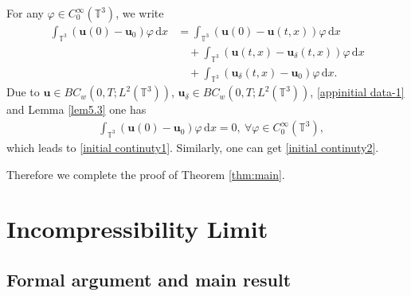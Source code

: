\documentclass[reqno,a4paper,11pt]{amsart}
\theoremstyle{plain}
\numberwithin{equation}{section}
\renewcommand{\d}{\mathrm{d}}
\newcommand{\dx}{\d x}
\begin{document}
							For any  $\varphi\in C_{0}^{\infty}(\mathbb{T}^{3})$, we write
							\begin{align}
								\int_{\mathbb{T}^{3}}(\mathbf{u}(0)-\mathbf{u}_{0})\varphi\,\dx&=\int_{\mathbb{T}^{3}}(\mathbf{u}(0)-\mathbf{u}(t,x))\varphi\,\dx\nonumber
								\\&\quad+\int_{\mathbb{T}^{3}}(\mathbf{u}(t,x)-\mathbf{u}_{\delta}(t,x))\varphi\,\dx\nonumber
								\\&\quad+\int_{\mathbb{T}^{3}}(\mathbf{u}_{\delta}(t,x)-\mathbf{u}_{0})\varphi\,\dx.
								\label{weak continuity0}
							\end{align}
							Due to $\mathbf{u}\in BC_{w}(0,T;L^{2}(\mathbb{T}^{3}))$, $\mathbf{u}_{\delta}\in BC_{w}(0,T;L^{2}(\mathbb{T}^{3}))$, \eqref{appinitial data-1} and  Lemma \ref{lem5.3} one has
							\begin{align*}
								&\int_{\mathbb{T}^{3}}(\mathbf{u}(0)-\mathbf{u}_{0})\varphi\,\dx=0,\ \forall \varphi\in C_{0}^{\infty}(\mathbb{T}^{3}),
							\end{align*}
							which leads to \eqref{initial continuty1}. Similarly, one can get \eqref{initial continuty2}.
							
							Therefore we complete the proof of Theorem \ref{thm:main}.
							
							
							\section{Incompressibility Limit}
							\label{sec:limit}
							\subsection{Formal argument and main result}
							
\end{document}
